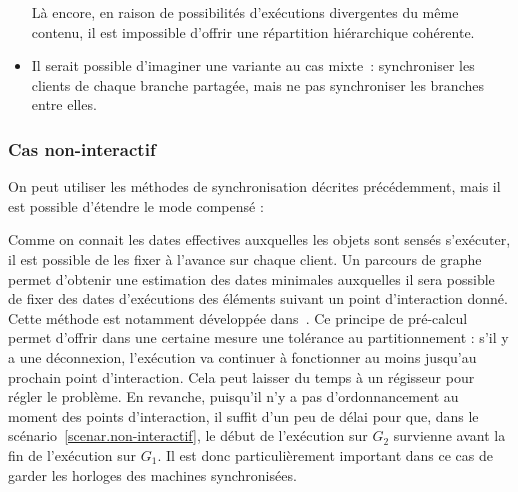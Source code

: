 \documentclass{article}
\newcommand\trigger{point d'interaction\xspace}
\begin{document}
\begin{itemize}
    Là encore, en raison de possibilités d'exécutions divergentes du même contenu, il est impossible d'offrir une répartition hiérarchique cohérente.
    
    \begin{figure}[h]
        \centering
        \begin{tikzpicture}
        
        \end{tikzpicture}
        \label{scenar.twobranches}
    \end{figure}

    \item Il serait possible d'imaginer une variante au cas mixte~: synchroniser les clients de chaque branche partagée, mais ne pas synchroniser les branches entre elles.
    
\end{itemize}



\subsubsection{Cas non-interactif}
On peut utiliser les méthodes de synchronisation décrites précédemment, mais il est possible d'étendre le mode compensé : 

Comme on connait les dates effectives auxquelles les objets sont sensés s'exécuter, il est possible de les fixer à l'avance sur chaque client. 
Un parcours de graphe permet d'obtenir une estimation des dates minimales auxquelles il sera possible de fixer des dates d'exécutions des éléments suivant un point d'interaction donné. 
Cette méthode est notamment développée dans~\cite{celerier2016rethinking}.
Ce principe de pré-calcul permet d'offrir dans une certaine mesure une tolérance au partitionnement : s'il y a une déconnexion, l'exécution va continuer à fonctionner au moins jusqu'au prochain \trigger.
Cela peut laisser du temps à un régisseur pour régler le problème.
En revanche, puisqu'il n'y a pas d'ordonnancement au moment des points d'interaction, il suffit d'un peu de délai pour que, dans le scénario~\ref{scenar.non-interactif}, le début de l'exécution sur $G_2$ survienne avant la fin de l'exécution sur $G_1$. 
Il est donc particulièrement important dans ce cas de garder les horloges des machines synchronisées.
\end{document}
